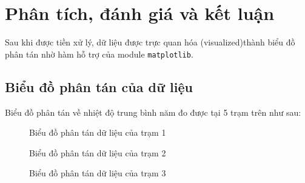 \documentclass[a4paper]{article}
\begin{document}
\section{Phân tích, đánh giá và kết luận}
Sau khi được tiền xử lý, dữ liệu được trực quan hóa (visualized)thành biểu đồ phân tán nhờ hàm hỗ trợ của module \lstinline{matplotlib}.

\subsection{Biểu đồ phân tán của dữ liệu}
Biểu đồ phân tán về nhiệt độ trung bình năm đo được tại 5 trạm trên như sau:
\begin{figure}[H]
\caption{Biểu đồ phân tán dữ liệu của trạm 1}
\end{figure}

\begin{figure}[H]
\caption{Biểu đồ phân tán dữ liệu của trạm 2}
\end{figure}

\begin{figure}[H]
\caption{Biểu đồ phân tán dữ liệu của trạm 3}
\end{figure}
\end{document}
